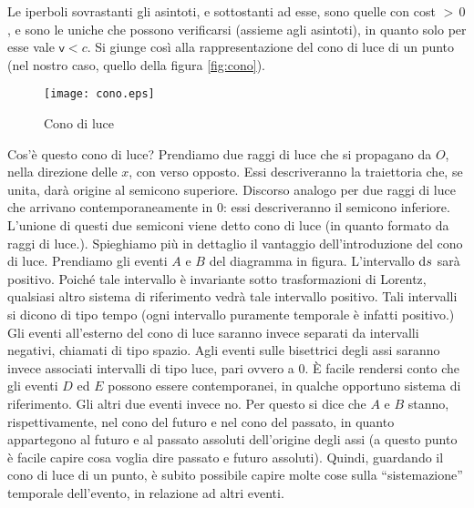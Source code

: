 Le iperboli sovrastanti gli asintoti, e sottostanti ad esse, sono
quelle con cost $>\,0$, e sono le uniche che possono verificarsi
(assieme agli asintoti), in quanto solo per esse vale
$\mathsf{v}<c$. Si giunge cos\`i alla rappresentazione del cono
di luce di un punto (nel nostro caso, quello della
figura \vref{fig:cono}).
\begin{figure}[tb]
  \begin{center}
     
       
    \texttt{[image: cono.eps]}
    \caption{Cono di luce} \label{fig:cono}
  \end{center}
\end{figure}
Cos'\`e questo cono di luce? Prendiamo due raggi di luce che si
propagano da $O$, nella direzione delle $x$, con verso opposto.  Essi
descriveranno la traiettoria che, se unita, dar\`a origine al semicono
superiore. Discorso analogo per due raggi di luce che arrivano
contemporaneamente in $0$: essi descriveranno il semicono
inferiore. L'unione di questi due semiconi viene detto cono di luce
(in quanto formato da raggi di luce.). Spieghiamo pi\`u in dettaglio
il vantaggio dell'introduzione del cono di luce.  Prendiamo gli eventi
$A$ e $B$ del diagramma in figura.  L'intervallo $\mathrm{d} s$ sar\`a
positivo. Poich\'e tale intervallo \`e invariante sotto trasformazioni
di Lorentz, qualsiasi altro sistema di riferimento vedr\`a tale
 intervallo positivo. Tali intervalli si dicono di tipo tempo (ogni
intervallo puramente temporale \`e infatti positivo.) Gli eventi
all'esterno del cono di luce saranno invece separati da intervalli
negativi, chiamati di tipo spazio. Agli eventi sulle bisettrici degli
assi saranno invece associati intervalli di tipo luce, pari ovvero a
0. \`E facile rendersi conto che gli eventi $D$ ed $E$ possono essere
contemporanei, in qualche opportuno sistema di riferimento. Gli altri
due eventi invece no. Per questo si dice che $A$ e $B$ stanno,
rispettivamente, nel cono del futuro e nel cono del passato, in quanto
appartegono al futuro e al passato assoluti
dell'origine degli assi (a questo punto \`e
facile capire cosa voglia dire passato e futuro assoluti). Quindi,
guardando il cono di luce di un punto, \`e subito possibile capire
molte cose sulla ``sistemazione'' temporale dell'evento, in relazione
ad altri eventi.

